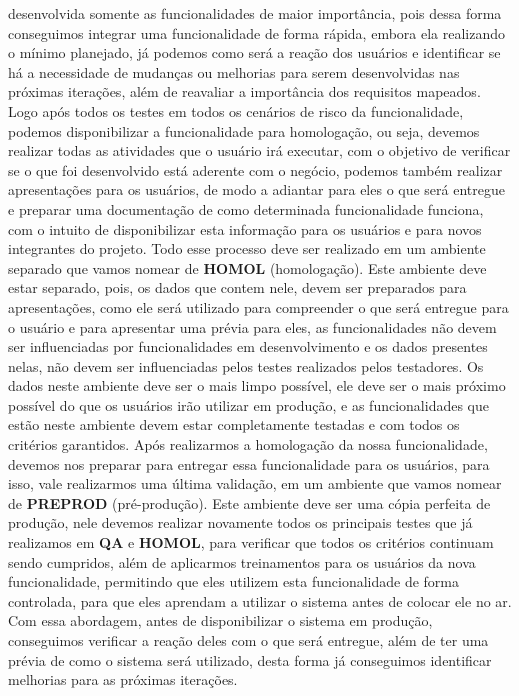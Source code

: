       desenvolvida somente as funcionalidades de maior importância, pois dessa
      forma conseguimos integrar uma funcionalidade de forma rápida, embora ela
      realizando o mínimo planejado, já podemos como será a reação dos usuários e
      identificar se há a necessidade de mudanças ou melhorias para serem desenvolvidas
      nas próximas iterações, além de reavaliar a importância dos requisitos mapeados. \newline
      Logo após todos os testes em todos os cenários de risco da funcionalidade,
      podemos disponibilizar a funcionalidade para homologação, ou seja, devemos
      realizar todas as atividades que o usuário irá executar, com o objetivo de
      verificar se o que foi desenvolvido está aderente com o negócio, podemos
      também realizar apresentações para os usuários, de modo a adiantar para eles
      o que será entregue e preparar uma documentação de como determinada funcionalidade
      funciona, com o intuito de disponibilizar esta informação para os usuários e
      para novos integrantes do projeto. Todo esse processo deve ser realizado em
      um ambiente separado que vamos nomear de \textbf{HOMOL} (homologação). Este ambiente deve
      estar separado, pois, os dados que contem nele, devem ser preparados para
      apresentações, como ele será utilizado para compreender o que será entregue
      para o usuário e para apresentar uma prévia para eles, as funcionalidades
      não devem ser influenciadas por funcionalidades em desenvolvimento e os
      dados presentes nelas, não devem ser influenciadas pelos testes realizados
      pelos testadores. Os dados neste ambiente deve ser o mais limpo possível,
      ele deve ser o mais próximo possível do que os usuários irão utilizar em
      produção, e as funcionalidades que estão neste ambiente devem estar completamente
      testadas e com todos os critérios garantidos. \newline
      Após realizarmos a homologação da nossa funcionalidade, devemos nos preparar
      para entregar essa funcionalidade para os usuários, para isso, vale realizarmos
      uma última validação, em um ambiente que vamos nomear de \textbf{PREPROD}
      (pré-produção). Este ambiente deve ser uma cópia perfeita de produção, nele
      devemos realizar novamente todos os principais testes que já realizamos em
      \textbf{QA} e \textbf{HOMOL}, para verificar que todos os critérios continuam
      sendo cumpridos, além de aplicarmos treinamentos para os usuários da nova
      funcionalidade, permitindo que eles utilizem esta funcionalidade de forma
      controlada, para que eles aprendam a utilizar o sistema antes de colocar ele
      no ar. Com essa abordagem, antes de disponibilizar o sistema em produção,
      conseguimos verificar a reação deles com o que será entregue, além de ter uma
      prévia de como o sistema será utilizado, desta forma já conseguimos identificar
      melhorias para as próximas iterações. \newline

